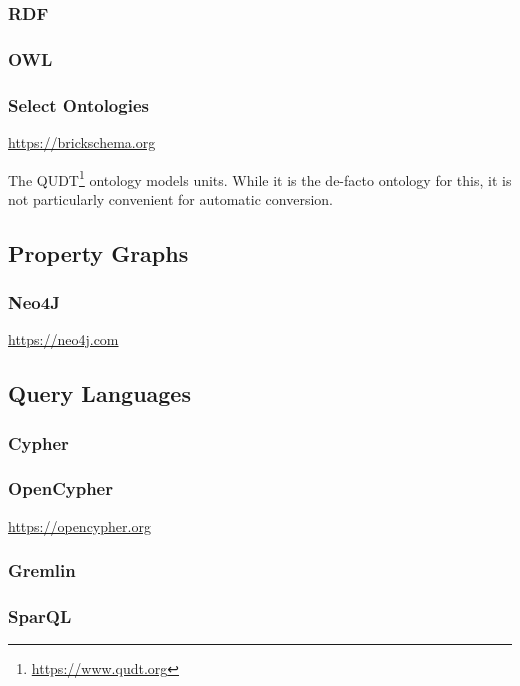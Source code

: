 \subsubsection{RDF}
\subsubsection{OWL}
\subsubsection{Select Ontologies}

\url{https://brickschema.org}



The QUDT\footnote{\url{https://www.qudt.org}} ontology models units. While it is the de-facto ontology for this, it is not particularly convenient for automatic conversion.

\subsection{Property Graphs}
\subsubsection{Neo4J}

\url{https://neo4j.com}

\subsection{Query Languages}
\subsubsection{Cypher}
\subsubsection{OpenCypher}

\url{https://opencypher.org}

\subsubsection{Gremlin}
\subsubsection{SparQL}


